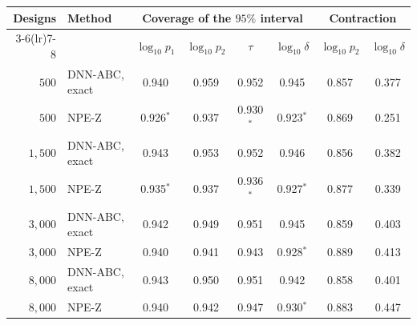 \begin{tabular}{rlcccccc}
\toprule
Designs & Method & \multicolumn{4}{c}{Coverage of the $95\%$ interval} & \multicolumn{2}{c}{Contraction} \\
\cmidrule(lr){3-6}\cmidrule(lr){7-8}
 & & $\log_{10}p_1$ & $\log_{10}p_2$ & $\tau$ & $\log_{10}\delta$ & $\log_{10}p_2$ & $\log_{10}\delta$ \\
\midrule
$500$ & DNN-ABC, exact & 0.940 & 0.959 & 0.952 & 0.945 & 0.857 & 0.377 \\
$500$ & NPE-Z & 0.926$^{\ast}$ & 0.937 & 0.930$^{\ast}$ & 0.923$^{\ast}$ & 0.869 & 0.251 \\
\addlinespace
$1{,}500$ & DNN-ABC, exact & 0.943 & 0.953 & 0.952 & 0.946 & 0.856 & 0.382 \\
$1{,}500$ & NPE-Z & 0.935$^{\ast}$ & 0.937 & 0.936$^{\ast}$ & 0.927$^{\ast}$ & 0.877 & 0.339 \\
\addlinespace
$3{,}000$ & DNN-ABC, exact & 0.942 & 0.949 & 0.951 & 0.945 & 0.859 & 0.403 \\
$3{,}000$ & NPE-Z & 0.940 & 0.941 & 0.943 & 0.928$^{\ast}$ & 0.889 & 0.413 \\
\addlinespace
$8{,}000$ & DNN-ABC, exact & 0.943 & 0.950 & 0.951 & 0.942 & 0.858 & 0.401 \\
$8{,}000$ & NPE-Z & 0.940 & 0.942 & 0.947 & 0.930$^{\ast}$ & 0.883 & 0.447 \\
\bottomrule
\end{tabular}
